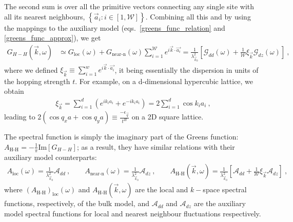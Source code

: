 \documentclass[prb]{revtex4-2}
\begin{document}
The second sum is over all the primitive vectors connecting any single site with all its nearest neighbours, $\left\{ \vec a_i: i \in \left[1, \mathcal{W}\right]\right\}$. Combining all this and by using the mappings to the auxiliary model (eqs.~\ref{greens_func_relation} and \ref{greens_func_approx}), we get
\begin{equation}\begin{aligned}
	\label{k_Gf_siam}
	G_{H-H} (\vec k, \omega) &\simeq G_\text{loc}(\omega) + G_\text{near-n}(\omega)\sum_{i=1}^{\mathcal{W}} e^{i \vec{k}\cdot\vec {a_i}} = \frac{1}{\lambda_{\vec k_0}^2}\left[\mathcal{G}_{dd}(\omega) + \frac{1}{\mathcal{W}}\xi_{\vec k}\mathcal{G}_{dz}(\omega) \right]~,
\end{aligned}\end{equation}
where we defined \(\xi_{\vec k} \equiv \sum_{i=1}^w e^{i \vec{k}\cdot\vec {a_i}}\), it being essentially the dispersion in units of the hopping strength \(t\). For example, on a d-dimensional hypercubic lattice, we obtain
\begin{equation}\begin{aligned}
	\xi_{\vec k} = \sum_{i=1}^d \left(e^{i k_i {a_i}} + e^{-i k_i {a_i}}\right) = 2\sum_{i=1}^d \cos k_i a_i~,
\end{aligned}\end{equation}
leading to \(2(\cos q_{x}a + \cos q_{y}a)\equiv \frac{-\epsilon_{\vec{q}}}{t^{H}}\) on a 2D square lattice. 

The spectral function is simply the imaginary part of the Greens function: \(A_\text{H-H} = -\frac{1}{\pi}\text{Im}\left[G_{H-H}\right] \); as a result, they have similar relations with their auxiliary model counterparts:
\begin{equation}\begin{aligned}
	A_\text{loc}(\omega) = \frac{1}{\lambda_{\vec k_0}^2}\mathcal{A}_{dd}~,\qquad A_\text{near-n}(\omega) = \frac{1}{\lambda_{\vec k_0}^2}\mathcal{A}_{dz}~,\qquad A_\text{H-H}(\vec{k},\omega) = \frac{1}{\lambda_{\vec k_0}^2}\left[\mathcal{A}_{dd} + \frac{1}{\mathcal{W}}\xi_{\vec k}\mathcal{A}_{dz} \right]~,
\end{aligned}\end{equation}
where \(\left(A_\text{H-H}\right)_\text{loc}(\omega)\) and \(A_\text{H-H}(\vec{k},\omega)\) are the local and \(k-\)space spectral functions, respectively, of the bulk model, and \(\mathcal{A}_{dd}\) and \(\mathcal{A}_{dz}\) are the auxiliary model spectral functions for local and nearest neighbour fluctuations respectively.
\end{document}
